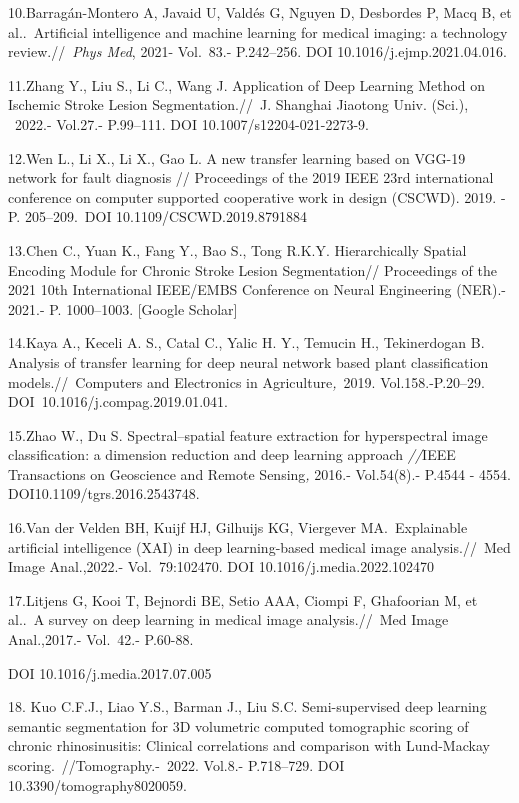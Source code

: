 10.Barragán-Montero A, Javaid U, Valdés G, Nguyen D, Desbordes P, Macq
B, et al..~Artificial intelligence and machine learning for medical
imaging: a technology review.//~\emph{Phys Med}, 2021- Vol.~83.-
P.242--256. DOI 10.1016/j.ejmp.2021.04.016.

11.Zhang Y., Liu S., Li C., Wang J. Application of Deep Learning Method
on Ischemic Stroke Lesion Segmentation.//~J. Shanghai Jiaotong Univ.
(Sci.), ~2022.- Vol.27.- P.99--111. DOI 10.1007/s12204-021-2273-9.~

12.Wen L., Li X., Li X., Gao L. A new transfer learning based on VGG-19
network for fault diagnosis // Proceedings of the 2019 IEEE 23rd
international conference on computer supported cooperative work in
design (CSCWD). 2019. - P. 205--209.~DOI 10.1109/CSCWD.2019.8791884

13.Chen C., Yuan K., Fang Y., Bao S., Tong R.K.Y. Hierarchically Spatial
Encoding Module for Chronic Stroke Lesion Segmentation// Proceedings of
the 2021 10th International IEEE/EMBS Conference on Neural Engineering
(NER).- 2021.- P. 1000--1003. {[}Google Scholar{]}

14.Kaya A., Keceli A. S., Catal C., Yalic H. Y., Temucin H.,
Tekinerdogan B. Analysis of transfer learning for deep neural network
based plant classification models.//~Computers and Electronics in
Agriculture\emph{,~}2019. Vol.158.-P.20--29.
DOI~10.1016/j.compag.2019.01.041.~

15.Zhao W., Du S. Spectral--spatial feature extraction for hyperspectral
image classification: a dimension reduction and deep learning approach
\emph{//}IEEE Transactions on Geoscience and Remote Sensing\emph{,}
2016.- Vol.54(8).- P.4544 - 4554. DOI10.1109/tgrs.2016.2543748.~

16.Van der Velden BH, Kuijf HJ, Gilhuijs KG, Viergever MA.~Explainable
artificial intelligence (XAI) in deep learning-based medical image
analysis.//~Med Image Anal.,2022.- Vol.~79:102470. DOI
10.1016/j.media.2022.102470

17.Litjens G, Kooi T, Bejnordi BE, Setio AAA, Ciompi F, Ghafoorian M, et
al..~A survey on deep learning in medical image analysis.//~Med Image
Anal.,2017.- Vol.~42.- P.60-88.

DOI 10.1016/j.media.2017.07.005

18. Kuo C.F.J., Liao Y.S., Barman J., Liu S.C. Semi-supervised deep
learning semantic segmentation for 3D volumetric computed tomographic
scoring of chronic rhinosinusitis: Clinical correlations and comparison
with Lund-Mackay scoring.~//Tomography.-\emph{~}2022. Vol.8.-
P.718--729. DOI 10.3390/tomography8020059.~

